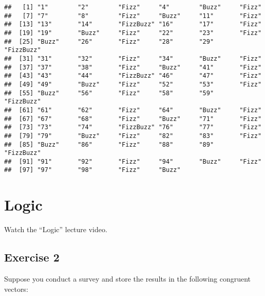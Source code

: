 \documentclass[
]{article}
\begin{document}
\begin{verbatim}
##   [1] "1"        "2"        "Fizz"     "4"        "Buzz"     "Fizz"    
##   [7] "7"        "8"        "Fizz"     "Buzz"     "11"       "Fizz"    
##  [13] "13"       "14"       "FizzBuzz" "16"       "17"       "Fizz"    
##  [19] "19"       "Buzz"     "Fizz"     "22"       "23"       "Fizz"    
##  [25] "Buzz"     "26"       "Fizz"     "28"       "29"       "FizzBuzz"
##  [31] "31"       "32"       "Fizz"     "34"       "Buzz"     "Fizz"    
##  [37] "37"       "38"       "Fizz"     "Buzz"     "41"       "Fizz"    
##  [43] "43"       "44"       "FizzBuzz" "46"       "47"       "Fizz"    
##  [49] "49"       "Buzz"     "Fizz"     "52"       "53"       "Fizz"    
##  [55] "Buzz"     "56"       "Fizz"     "58"       "59"       "FizzBuzz"
##  [61] "61"       "62"       "Fizz"     "64"       "Buzz"     "Fizz"    
##  [67] "67"       "68"       "Fizz"     "Buzz"     "71"       "Fizz"    
##  [73] "73"       "74"       "FizzBuzz" "76"       "77"       "Fizz"    
##  [79] "79"       "Buzz"     "Fizz"     "82"       "83"       "Fizz"    
##  [85] "Buzz"     "86"       "Fizz"     "88"       "89"       "FizzBuzz"
##  [91] "91"       "92"       "Fizz"     "94"       "Buzz"     "Fizz"    
##  [97] "97"       "98"       "Fizz"     "Buzz"
\end{verbatim}

\hypertarget{logic}{%
\section{Logic}\label{logic}}

Watch the ``Logic'' lecture video.

\hypertarget{exercise-2}{%
\subsection{Exercise 2}\label{exercise-2}}

Suppose you conduct a survey and store the results in the following
congruent vectors:
\end{document}
